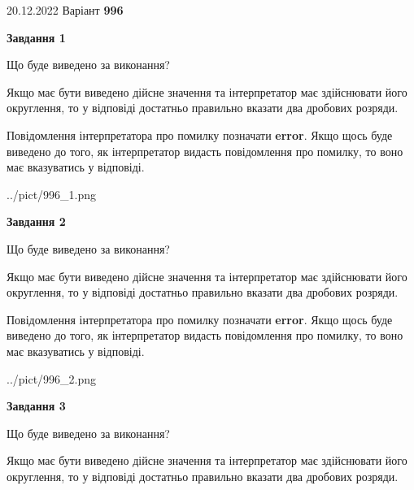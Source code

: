 \documentclass[12pt, ukrainian]{article}
\begin{document}
{20.12.2022 Варіант \No \textbf { 996 }\par}
{
\begin {Large}

{\begin {center}\textbf{Завдання 1}\end {center}}\par
Що буде виведено за виконання? \par

Якщо має бути виведено дійсне значення та інтерпретатор має здійснювати його округлення, 
то у відповіді достатньо правильно вказати два дробових розряди.

Повідомлення інтерпретатора про помилку позначати \textbf{error}.
Якщо щось буде виведено до того, як інтерпретатор видасть повідомлення про помилку, 
то воно має вказуватись у відповіді. \par

\begin{center}
	{../pict/996_1.png}
\end{center}
\newpage

{\begin {center}\textbf{Завдання 2}\end {center}}\par
Що буде виведено за виконання? \par

Якщо має бути виведено дійсне значення та інтерпретатор має здійснювати його округлення, 
то у відповіді достатньо правильно вказати два дробових розряди.

Повідомлення інтерпретатора про помилку позначати \textbf{error}.
Якщо щось буде виведено до того, як інтерпретатор видасть повідомлення про помилку, 
то воно має вказуватись у відповіді. \par

\begin{center}
	{../pict/996_2.png}
\end{center}
\newpage

{\begin {center}\textbf{Завдання 3}\end {center}}\par
Що буде виведено за виконання? \par

Якщо має бути виведено дійсне значення та інтерпретатор має здійснювати його округлення, 
то у відповіді достатньо правильно вказати два дробових розряди.


\end{Large}}
\end{document}
